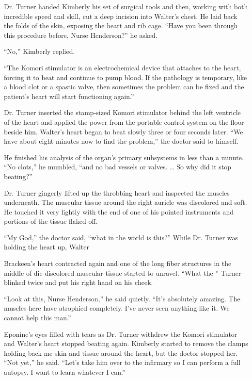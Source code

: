\documentclass[]{article}
\begin{document}
{Dr. Turner handed Kimberly his set of surgical tools and then, working with both incredible speed and skill, cut a deep incision into Walter’s chest. He laid back the folds of the skin, exposing the heart and rib cage. “Have you been through this procedure before, Nurse Henderson?” he asked.

“No,” Kimberly replied.

“The Komori stimulator is an electrochemical device that attaches to the heart, forcing it to beat and continue to pump blood. If the pathology is temporary, like a blood clot or a spastic valve, then sometimes the problem can be fixed and the patient’s heart will start functioning again.”

Dr. Turner inserted the stamp-sized Komori stimulator behind the left ventricle of the heart and applied the power from the portable control system on the floor beside him. Walter’s heart began to beat slowly three or four seconds later. “We have about eight minutes now to find the problem,” the doctor said to himself.

He finished his analysis of the organ’s primary subsystems in less than a minute. “No clots,” he mumbled, “and no bad vessels or valves. … So why did it stop beating?”

Dr. Turner gingerly lifted up the throbbing heart and inspected the muscles underneath. The muscular tissue around the right auricle was discolored and soft. He touched it very lightly with the end of one of his pointed instruments and portions of the tissue flaked off.

“My God,” the doctor said, “what in the world is this?” While Dr. Turner was holding the heart up, Walter

Brackeen’s heart contracted again and one of the long fiber structures in the middle of die discolored muscular tissue started to unravel. “What the-” Turner blinked twice and put his right hand on his cheek.

“Look at this, Nurse Henderson,” he said quietly. “It’s absolutely amazing. The muscles here have atrophied completely. I’ve never seen anything like it. We cannot help this man.”

Eponine’s eyes filled with tears as Dr. Turner withdrew the Komori stimulator and Walter’s heart stopped beating again. Kimberly started to remove the clamps holding back me skin and tissue around the heart, but the doctor stopped her. “Not yet,” he said. “Let’s take him over to the infirmary so I can perform a full autopsy. I want to learn whatever I can.”

}
\end{document}
